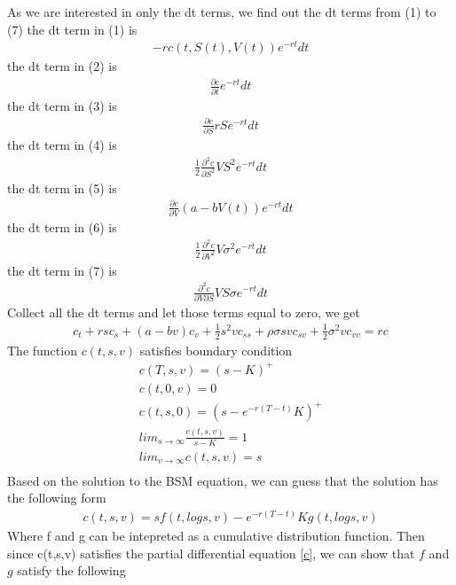 \documentclass[a4paper]{article}
\begin{document}
As we are interested in only the dt terms, we find out the dt terms from (1) to (7)
the dt term in (1) is
\begin{align*}
	-rc(t, S(t), V(t))e^{-rt}dt
\end{align*}
the dt term in (2) is
\begin{align*}
	\frac{\partial c}{\partial t}e^{-rt}dt
\end{align*}
the dt term in (3) is
\begin{align*}
	\frac{\partial c}{\partial S}rSe^{-rt}dt
\end{align*}
the dt term in (4) is
\begin{align*}
	\frac{1}{2} \frac{\partial^2 c}{\partial S^2}VS^2e^{-rt}dt
\end{align*}
the dt term in (5) is
\begin{align*}
	\frac{\partial c}{\partial V}(a-bV(t))e^{-rt}dt
\end{align*}
the dt term in (6) is
\begin{align*}
	\frac{1}{2} \frac{\partial^2 c}{\partial V^2}V\sigma^2e^{-rt}dt
\end{align*}
the dt term in (7) is
\begin{align*}
	\frac{\partial^2 c}{\partial V \partial S} VS\sigma e^{-rt}dt
\end{align*}
Collect all the dt terms and let those terms equal to zero, we get
\begin{align}\label{c}
	c_t + rs c_s + (a-bv)c_v + \frac{1}{2} s^2 v c_{ss} + \rho \sigma svc_{sv}
	+\frac{1}{2} \sigma^2vc_{vv} = rc
\end{align}
The function $c(t, s, v)$ satisfies boundary condition
\begin{align*}
	c(T, s, v) = (s-K)^+ \\
	c(t, 0, v) = 0 \\
	c(t, s, 0) = (s - e^{-r(T-t)}K)^+\\
	lim_{s \to \infty} \frac{c(t, s, v)}{s-K} = 1 \\
	lim_{v \to \infty} c(t, s, v) = s\\  
\end{align*}
Based on the solution to the BSM equation, we can guess that the solution has the following form
\begin{align}
	c(t,s,v) = sf(t, logs, v) - e^{-r(T-t)}Kg(t,logs,v)
\end{align}	
Where f and g can be intepreted as a cumulative distribution function.
Then since c(t,s,v) satisfies the partial differential equation \ref{c}, we can show that $f$ and $g$ satisfy the following
\end{document}
